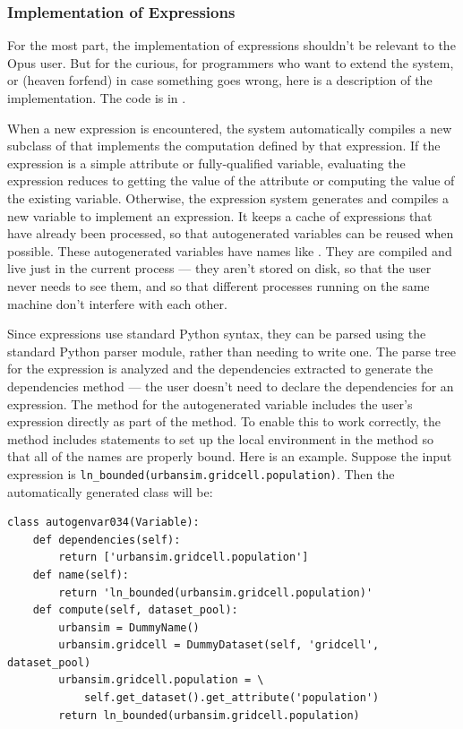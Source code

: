 {\subsubsection{Implementation of Expressions}

For the most part, the implementation of expressions shouldn't be relevant
to the Opus user.  But for the curious, for programmers who want to extend
the system, or (heaven forfend) in case something goes wrong, here is a
description of the implementation.  The code is in
.  

When a new expression is encountered, the system automatically compiles a
new subclass of  that implements the computation defined by
that expression.  If the expression is a simple attribute or
fully-qualified variable, evaluating the expression reduces to getting the
value of the attribute or computing the value of the existing
variable. Otherwise, the expression system generates and compiles a new
variable to implement an expression. It keeps a cache of expressions that
have already been processed, so that autogenerated variables can be reused
when possible. These autogenerated variables have names like
. They are compiled and live just in the current
process --- they aren't stored on disk, so that the user never needs to see
them, and so that different processes running on the same machine don't
interfere with each other.

Since expressions use standard Python syntax, they can be parsed using the
standard Python parser module, rather than needing to write one. The parse
tree for the expression is analyzed and the dependencies extracted to
generate the dependencies method --- the user doesn't need to declare the
dependencies for an expression. The  method for the
autogenerated variable includes the user's expression directly as part of
the method.  To enable this to work correctly, the method includes
statements to set up the local environment in the method so that all of the
names are properly bound.  Here is an example.  Suppose the input
expression is \verb|ln_bounded(urbansim.gridcell.population)|.  Then the
automatically generated class will be:
\begin{verbatim}
class autogenvar034(Variable):
    def dependencies(self):
        return ['urbansim.gridcell.population']
    def name(self):
        return 'ln_bounded(urbansim.gridcell.population)'
    def compute(self, dataset_pool):
        urbansim = DummyName()
        urbansim.gridcell = DummyDataset(self, 'gridcell', dataset_pool)
        urbansim.gridcell.population = \
            self.get_dataset().get_attribute('population')
        return ln_bounded(urbansim.gridcell.population)
\end{verbatim}

}
